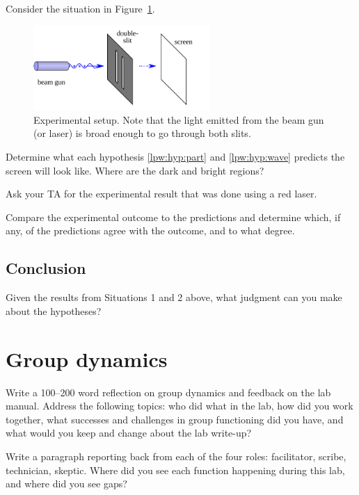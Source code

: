 Consider the situation in Figure~\ref{lpw:fig:2slit-setup}.

\begin{figure}
	\centering
	\includegraphics[width=0.6\textwidth]{light-particle-wave/Double-slit-setup.pdf}
	\caption{Experimental setup. Note that the light emitted from the beam gun (or laser) is broad enough to go through both slits.}\label{lpw:fig:2slit-setup}
\end{figure}

\begin{steps}
	\item Determine what each hypothesis \ref{lpw:hyp:part} and \ref{lpw:hyp:wave} predicts the screen will look like. Where are the dark and bright regions?
	
	\item Ask your TA for the experimental result that was done using a red laser.
	
	\item Compare the experimental outcome to the predictions and determine which, if any, of the predictions agree with the outcome, and to what degree.
\end{steps}




\subsection{Conclusion}

\begin{steps}
	\item Given the results from Situations 1 and 2 above, what judgment can you make about the hypotheses?
\end{steps}

\section{Group dynamics}

\begin{steps}
	\item Write a 100--200 word reflection on group dynamics and feedback on the lab manual. Address the following topics: who did what in the lab, how did you work together, what successes and challenges in group functioning did you have, and what would you keep and change about the lab write-up?
	
	\item Write a paragraph reporting back from each of the four roles: facilitator, scribe, technician, skeptic. Where did you see each function happening during this lab, and where did you see gaps?
\end{steps}

